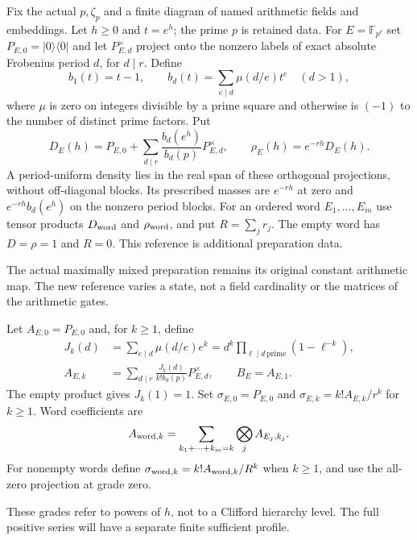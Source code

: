\begin{definition}
Fix the actual $p,\zeta_p$ and a finite diagram of named arithmetic fields
and embeddings. Let $h\geq0$ and $t=e^h$; the prime $p$ is retained data.
For $E=\mathbb F_{p^r}$ set $P_{E,0}=|0\rangle\langle0|$ and let
$P_{E,d}^{\times}$ project onto the nonzero labels of exact absolute
Frobenius period $d$, for $d\mid r$. Define
\[
 b_1(t)=t-1,\qquad b_d(t)=\sum_{e\mid d}\mu(d/e)t^e\quad(d>1),
\]
where $\mu$ is zero on integers divisible by a prime square and otherwise
is $(-1)$ to the number of distinct prime factors. Put
\[
 D_E(h)=P_{E,0}+\sum_{d\mid r}\frac{b_d(e^h)}{b_d(p)}P_{E,d}^{\times},
 \qquad \rho_E(h)=e^{-rh}D_E(h).
\]
A period-uniform density lies in the real span of these orthogonal
projections, without off-diagonal blocks. Its prescribed masses are
$e^{-rh}$ at zero and $e^{-rh}b_d(e^h)$ on the nonzero period blocks.
For an ordered word $E_1,\ldots,E_m$ use tensor products $D_{\rm word}$
and $\rho_{\rm word}$, and put $R=\sum_jr_j$. The empty word has
$D=\rho=1$ and $R=0$. This reference is additional preparation data.
\end{definition}
\begin{scope}
The actual maximally mixed preparation remains its original constant
arithmetic map. The new reference varies a state, not a field cardinality
or the matrices of the arithmetic gates.
\end{scope}

\begin{definition}
Let $A_{E,0}=P_{E,0}$ and, for $k\geq1$, define
\begin{align*}
 J_k(d)&=\sum_{e\mid d}\mu(d/e)e^k
       =d^k\prod_{\ell\mid d\,\mathrm{prime}}(1-\ell^{-k}),\\
 A_{E,k}&=\sum_{d\mid r}\frac{J_k(d)}{k!b_d(p)}P_{E,d}^{\times},
 \qquad B_E=A_{E,1}.
\end{align*}
The empty product gives $J_k(1)=1$. Set $\sigma_{E,0}=P_{E,0}$ and
$\sigma_{E,k}=k!A_{E,k}/r^k$ for $k\geq1$. Word coefficients are
\[
 A_{{\rm word},k}=\sum_{k_1+\cdots+k_m=k}\bigotimes_j A_{E_j,k_j}.
\]
For nonempty words define $\sigma_{{\rm word},k}=k!A_{{\rm word},k}/R^k$
when $k\geq1$, and use the all-zero projection at grade zero.
\end{definition}
\begin{scope}
These grades refer to powers of $h$, not to a Clifford hierarchy level.
The full positive series will have a separate finite sufficient profile.
\end{scope}

